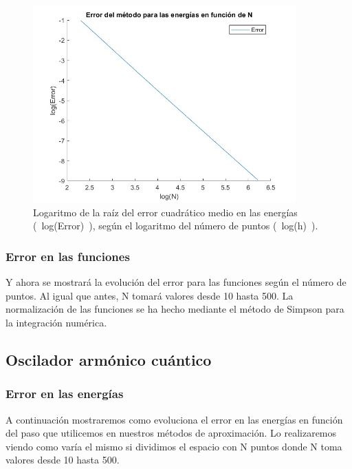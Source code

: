 \documentclass[12pt]{article}
\begin{document}
    \begin{figure}[H]
        \centering
        \includegraphics[width=0.9\textwidth]{fotos/logerror_ener_infinito_500.jpg}
        \caption{Logaritmo de la raíz del error cuadrático medio en las energías (~log(Error)~), según el logaritmo del número de puntos (~log(h)~).}
        \end{figure}

    \subsubsection{Error en las funciones}

    Y ahora se mostrará la evolución del error para las funciones según el número de puntos. Al igual que antes, N tomará valores desde 10 hasta 500. La normalización de las funciones se ha hecho mediante el método de Simpson para la integración numérica.
    

    
    \subsection{Oscilador armónico cuántico}

    \subsubsection{Error en las energías}

    A continuación mostraremos como evoluciona el error en las energías en función del paso que utilicemos en nuestros métodos de aproximación. Lo realizaremos viendo como varía el mismo si dividimos el espacio con N puntos donde N toma valores desde 10 hasta 500.
    
\end{document}
